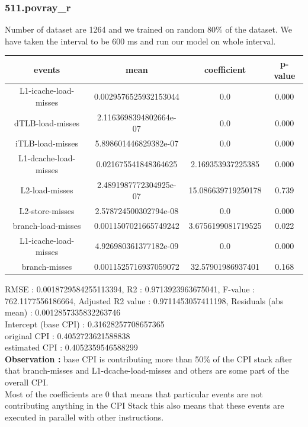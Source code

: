 \documentclass[10pt, letterpaper, IEEEtran, tikz,border=5,a4paper,fleqn]{article}
\begin{document}
\subsubsection{511.povray\_r}
Number of dataset are 1264 and we trained on random 80\% of the dataset. We have taken the interval to be 600 ms and run our model on whole interval.
\begin{center}
\begin{tabular}{||c c c c||}
 \hline
 \textbf{events} & \textbf{mean} & \textbf{coefficient} & \textbf{p-value}\\ [0.5ex]
 \hline\hline
 L1-icache-load-misses & 0.0029576525932153044 & 0.0 & 0.000\\
 \hline
 dTLB-load-misses & 2.1163698394802664e-07 & 0.0 & 0.000\\
 \hline
 iTLB-load-misses & 5.898601446829382e-07 & 0.0 & 0.000\\
 \hline
 L1-dcache-load-misses & 0.021675541848364625 & 2.169353937225385 & 0.000\\
 \hline
 L2-load-misses & 2.4891987772304925e-07 & 15.086639719250178 & 0.739\\
 \hline
 L2-store-misses & 2.578724500302794e-08 & 0.0 & 0.000\\
 \hline
 branch-load-misses & 0.0011507021665749242 & 3.6756199081719525 & 0.022\\
 \hline
 L1-icache-load-misses & 4.926980361377182e-09 & 0.0 & 0.000\\
 \hline
 branch-misses & 0.0011525716937059072 & 32.57901986937401 & 0.168\\
 \hline
\end{tabular}
\end{center}
RMSE : 0.0018729584255113394,
R2 : 0.9713923963675041,
F-value : 762.1177556186664,
Adjusted R2 value : 0.9711453057411198,
Residuals (abs mean) : 0.0012857335832263746\\

\noindent Intercept (base CPI) : 0.31628257708657365\\
original CPI : 0.4052723621588838\\
estimated CPI : 0.4052359546588299\\

\noindent \textbf{Observation :} base CPI is contributing more than 50\% of the CPI stack after that branch-misses and L1-dcache-load-misses and others are some part of the overall CPI.\\
Most of the coefficients are 0 that means that particular events are not contributing anything in the CPI Stack this also means that these events are executed in parallel with other instructions.
\end{document}
